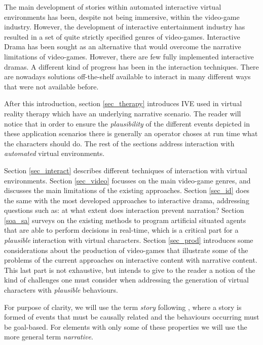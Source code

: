 \documentclass[
		twoside,openright,titlepage,numbers=noenddot,manychapters,
		headinclude,%
                footinclude=false,cleardoublepage=empty,
                BCOR=5mm,
		fontsize=11pt, %
                 enabledeprecatedfontcommands]{scrreprt}
\begin{document}
The main development of stories within automated interactive virtual environments has been, despite not being immersive, within the video-game industry. However, the development of interactive entertainment industry has resulted in a set of quite strictly specified genres of video-games. Interactive Drama has been sought as an alternative that would overcome the narrative limitations of video-games. However, there are few fully implemented interactive dramas. A different kind of progress has been in the interaction techniques. There are nowadays solutions off-the-shelf available to interact in many different ways that were not available before.


After this introduction, section \ref{sec_therapy} introduces IVE used in virtual reality therapy which have an underlying narrative scenario.  The reader will notice that in order to ensure the \emph{plausibility} of the different events depicted in these application scenarios there is generally an operator choses at run time what the characters should do. The rest of the sections address interaction with \emph{automated} virtual environments.

 Section \ref{sec_interact} describes different techniques of interaction with virtual environments. 
%
Section \ref{sec_video} focusses on  the main video-game genres, and discusses the main limitations of the existing approaches. Section \ref{sec_id} does the same with  the most developed approaches to interactive drama, addressing questions such as: at what extent does interaction prevent narration? 
%
Section \ref{soa_sa} surveys on the existing methods to program artificial situated agents that are able to perform decisions in real-time, which is a critical part for a \emph{plausible} interaction with virtual characters. 
%
Section \ref{sec_prod} introduces some considerations about the production of video-games  that illustrate some of the problems of the current approaches on interactive content with narrative content. This last part is not exhaustive, but intends to give to the reader a notion of the kind of challenges one must consider when addressing the generation of virtual characters with \emph{plausible} behaviours. 
%

For purpose of clarity,  we will use the term \emph{story} following \cite{stein1982ds}, where a story is formed of events that must be causally related and the behaviours occurring must be goal-based. For elements with only some of these properties we will use the more general term \emph{narrative}. 
%
\end{document}
